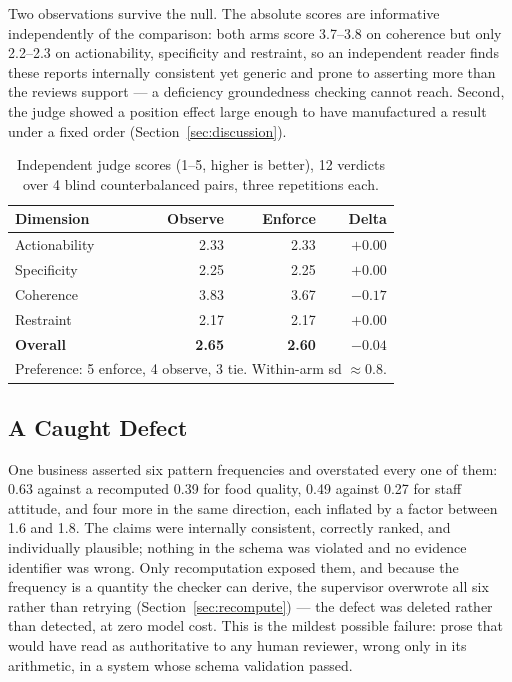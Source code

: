 \documentclass[runningheads]{llncs}
\begin{document}
Two observations survive the null. The absolute scores are informative
independently of the comparison: both arms score 3.7--3.8 on coherence but only
2.2--2.3 on actionability, specificity and restraint, so an independent reader
finds these reports internally consistent yet generic and prone to asserting more
than the reviews support --- a deficiency groundedness checking cannot reach.
Second, the judge showed a position effect large enough to have manufactured a
result under a fixed order (Section~\ref{sec:discussion}).

\begin{table}[t]
\caption{Independent judge scores (1--5, higher is better), 12 verdicts over 4
blind counterbalanced pairs, three repetitions each.}
\label{tab:judge}
\centering
\begin{tabular}{lrrr}
\toprule
Dimension & Observe & Enforce & Delta \\
\midrule
Actionability & 2.33 & 2.33 & $+0.00$ \\
Specificity   & 2.25 & 2.25 & $+0.00$ \\
Coherence     & 3.83 & 3.67 & $-0.17$ \\
Restraint     & 2.17 & 2.17 & $+0.00$ \\
\midrule
\textbf{Overall} & \textbf{2.65} & \textbf{2.60} & $\mathbf{-0.04}$ \\
\multicolumn{4}{l}{Preference: 5 enforce, 4 observe, 3 tie. Within-arm sd $\approx 0.8$.} \\
\bottomrule
\end{tabular}
\end{table}

\subsection{A Caught Defect}
\label{sec:caught}

One business asserted six pattern frequencies and overstated every one of them:
0.63 against a recomputed 0.39 for food quality, 0.49 against 0.27 for staff
attitude, and four more in the same direction, each inflated by a factor between
1.6 and 1.8. The claims were internally consistent, correctly ranked, and
individually plausible; nothing in the schema was violated and no evidence
identifier was wrong. Only recomputation exposed them, and because the frequency
is a quantity the checker can derive, the supervisor overwrote all six rather
than retrying (Section~\ref{sec:recompute}) --- the defect was deleted rather than
detected, at zero model cost. This is the mildest possible failure: prose that
would have read as authoritative to any human reviewer, wrong only in its
arithmetic, in a system whose schema validation passed.
\end{document}
